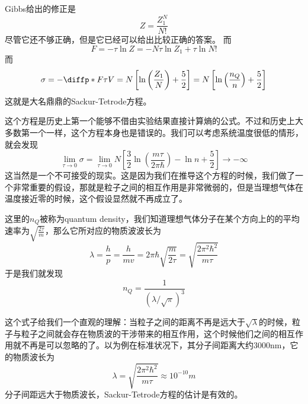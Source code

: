 \begin{solution}
       Gibbs给出的修正是\begin{equation}
              Z=\frac{Z_1^N}{N!}
       \end{equation}
       尽管它还不够正确，但是它已经可以给出比较正确的答案。
       而\begin{equation}
              F=-\tau \ln Z=-N\tau \ln Z_1 +\tau \ln N !
       \end{equation}
       而\begin{equation}
              \sigma=-\diffp*{F}{\tau}{V}=N\left[\ln \left(\frac{Z_1}{N}\right)+\frac{5}{2}\right]=N\left[\ln\left(\frac{n_Q}{n}\right)+\frac{5}{2}\right]
       \end{equation}
       这就是大名鼎鼎的Sackur-Tetrode方程。
\end{solution}
这个方程是历史上第一个能够不借由实验结果直接计算熵的公式。不过和历史上大多数第一个一样，这个方程本身也是错误的。我们可以考虑系统温度很低的情形，就会发现\begin{equation}
       \lim_{\tau \to 0} \sigma =\lim_{\tau\to 0} N \left[\frac{3}{2}\ln\left(\frac{m\tau}{2\pi \hbar}\right) -\ln n +\frac{5}{2}\right] \to -\infty
\end{equation}
这当然是一个不可接受的现实。这是因为我们在推导这个方程的时候，我们做了一个非常重要的假设，那就是粒子之间的相互作用是非常微弱的，但是当理想气体在温度接近零的时候，这个假设显然就不再成立了。

这里的$n_Q$被称为quantum density，我们知道理想气体分子在某个方向上的的平均速率为$\displaystyle \sqrt{\frac{2\tau}{ m}}$，那么它所对应的物质波波长为\begin{equation}
       \lambda=\frac{h}{p}=\frac{h}{m v}=2\pi \hbar \sqrt{\frac{m}{2\tau}}=\sqrt{\frac{2\pi^2 \hbar^2}{m\tau}}
\end{equation}
于是我们就发现\begin{equation}
       n_Q=\frac{1}{(\lambda/\sqrt{\pi})^3}
\end{equation}

这个式子给我们一个直观的理解：当粒子之间的距离不再是远大于$\sqrt{\lambda}$的时候，粒子与粒子之间就会存在物质波的干涉带来的相互作用，这个时候他们之间的相互作用就不再是可以忽略的了。以为例在标准状况下，其分子间距离大约3000nm，它的物质波长为\begin{equation}
       \lambda=\sqrt{\frac{2\pi^2 \hbar^2}{m\tau}}\approx 10^{-10}m
\end{equation}
分子间距远大于物质波长，Sackur-Tetrode方程的估计是有效的。

